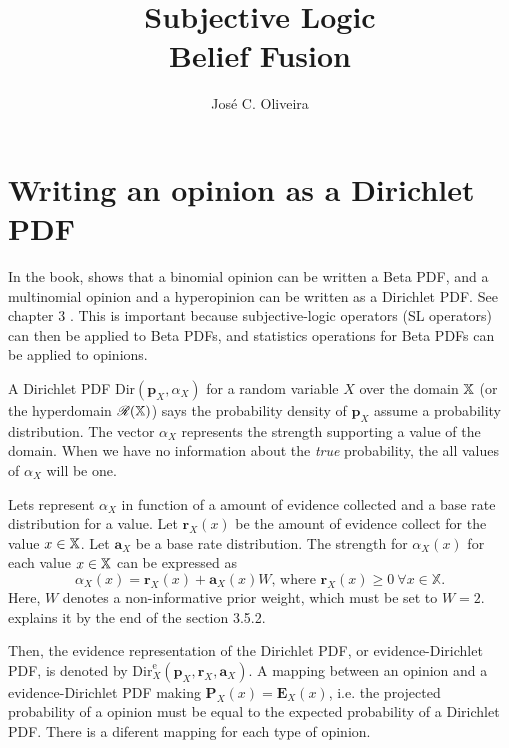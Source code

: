 \documentclass[a4paper,12pt]{article}
\title{Subjective Logic\\
\large{Belief Fusion}}
\author{José C. Oliveira}
\theoremstyle{definition}
\theoremstyle{theorem}
\numberwithin{equation}{section}
\begin{document}
\maketitle

\section{Writing an opinion as a Dirichlet PDF}

In the book, \citeauthor{josang2016subjective} shows that a binomial opinion can be written a Beta PDF, and a multinomial opinion and a hyperopinion can be written as a Dirichlet PDF. See chapter 3 \cite{josang2016subjective}. This is important because subjective-logic operators (SL operators) can then be applied to Beta PDFs, and statistics operations for Beta PDFs can be applied to opinions.

A Dirichlet PDF $\mathrm{Dir}(\mathbf{p}_X, \alpha_X)$ for a random variable $X$ over the domain $\mathbb{X}$ (or the hyperdomain $\mathcal{R}(\mathbb{X})$) says the probability density of $\mathbf{p}_X$ assume a probability distribution. The vector $\alpha_X$ represents the strength supporting a value of the domain. When we have no information about the \emph{true} probability, the all values of $\alpha_X$ will be one.

Lets represent $\alpha_X$ in function of a amount of evidence collected and a base rate distribution for a value. Let $\mathbf{r}_X(x)$ be the amount of evidence collect for the value $x \in \mathbb{X}$. Let $\mathbf{a}_X$ be a base rate distribution. The strength for $\alpha_X(x)$ for each value $x \in \mathbb{X}$ can be expressed as
\begin{equation}\label{eq:alpha_as_evidence_and_base_rate}
    \alpha_X(x) = \mathbf{r}_X(x) + \mathbf{a}_X(x)W\text{, where }\mathbf{r}_X(x) \geq 0\ \forall x \in \mathbb{X}\text{.}
\end{equation}
Here, $W$ denotes a non-informative prior weight, which must be set to $W = 2$. \citeauthor{josang2016subjective} explains it by the end of the section 3.5.2.

Then, the evidence representation of the Dirichlet PDF, or evidence-Dirichlet PDF, is denoted by $\mathrm{Dir}^{\mathrm{e}}_X(\mathbf{p}_X, \mathbf{r}_X, \mathbf{a}_X)$. A mapping between an opinion and a evidence-Dirichlet PDF making $\mathbf{P}_X(x) = \mathbf{E}_X(x)$, i.e. the projected probability of a opinion must be equal to the expected probability of a Dirichlet PDF. There is a diferent mapping for each type of opinion.
\end{document}
